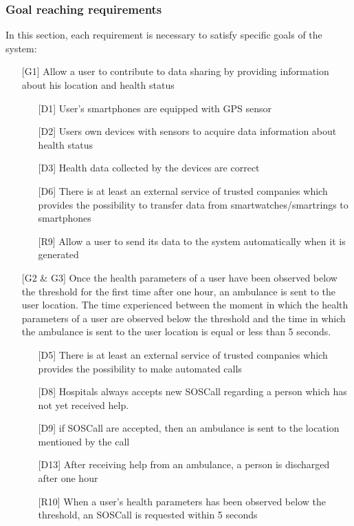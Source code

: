 \subsubsection{Goal reaching requirements}
\par
In this section, each requirement is necessary to satisfy specific goals of the system:
\begin{itemize}

\item[{[G1]}] Allow a user to contribute to data sharing by providing information about his location and health status
	\begin{itemize}
	\item[{[D1]}]  User's smartphones are equipped with GPS sensor
	\item[{[D2]}] Users own devices with sensors to acquire data information about health status
	\item[{[D3]}] Health data collected by the devices are correct
	\item[{[D6]}] There is at least an external service of trusted companies which provides the possibility to transfer data from smartwatches/smartrings to smartphones
	\item[{[R9]}] Allow a user to send its data to the system automatically when it is generated
	\end{itemize}
\item[{[G2 \& G3]}] Once the health parameters of a user have been observed 
below the threshold for the first time after one hour, an ambulance is sent to the user location. 
The time experienced between the moment in which the health parameters of a user are observed below the threshold and the time in which the ambulance is sent to the user location is equal or less than 5 seconds. 
	\begin{itemize}
	\item[{[D5]}] There is at least an external service of trusted companies which provides the possibility to make automated calls
	\item[{[D8]}] Hospitals always accepts new SOSCall regarding a person which has not yet received help.
	\item[{[D9]}] if SOSCall are accepted, then an ambulance is sent to the location mentioned by the call
	\item[{[D13]}] After receiving help from an ambulance, a person is discharged after one hour
	\item[{[R10]}] When a user's health parameters has been observed below the threshold, an SOSCall is requested within 5 seconds

\end{itemize}
\end{itemize}
